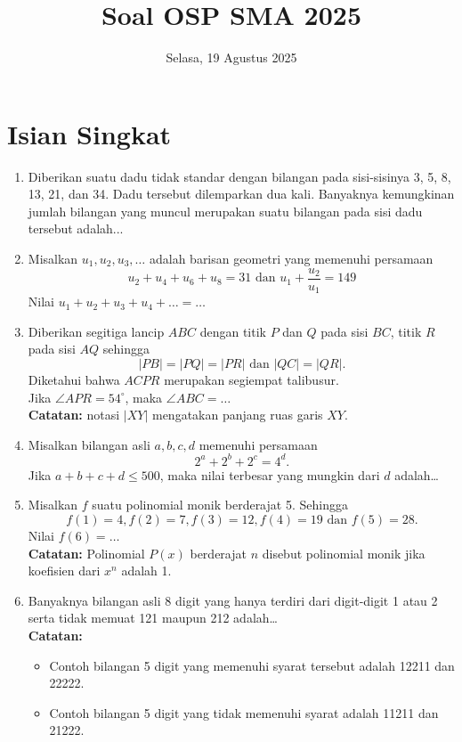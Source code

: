 \documentclass[12pt]{scrartcl}
\title{Soal OSP SMA 2025}
\date{Selasa, 19 Agustus 2025}
\begin{document}
\maketitle

\section{Isian Singkat}

\begin{enumerate}
    \item Diberikan suatu dadu tidak standar dengan bilangan pada sisi-sisinya 3, 5, 8, 13, 21, dan 34. Dadu tersebut dilemparkan dua kali. Banyaknya kemungkinan jumlah bilangan yang muncul merupakan suatu bilangan pada sisi dadu tersebut adalah...

    \item Misalkan $u_1, u_2, u_3, \dots$ adalah barisan geometri yang memenuhi persamaan 
    $$u_2 + u_4 + u_6 + u_8 = 31 \text{ dan } u_1+\dfrac{u_2}{u_1} = 149$$
    Nilai $u_1 + u_2 + u_3 + u_4 + \dots = \dots$

    \item Diberikan segitiga lancip $ABC$ dengan titik $P$ dan $Q$ pada sisi $BC$, titik $R$ pada sisi $AQ$ sehingga $$|PB|=|PQ|=|PR| \text{ dan } |QC|=|QR|.$$
    Diketahui bahwa $ACPR$ merupakan segiempat talibusur.\\
    Jika $\angle APR=54^\circ$, maka $\angle ABC = \dots$ \\
    \textbf{Catatan:} notasi $|XY|$ mengatakan panjang ruas garis $XY$.

    \item Misalkan bilangan asli $a, b, c, d$ memenuhi persamaan $$2^a+2^b+2^c=4^d.$$
    Jika $a+b+c+d \le 500$, maka nilai terbesar yang mungkin dari $d$ adalah\dots

    \newpage
    \item Misalkan $f$ suatu polinomial monik berderajat 5. Sehingga 
    $$f(1)=4, f(2)=7, f(3)=12, f(4)=19 \text{ dan }f(5)=28.$$
    Nilai $f(6)=\dots$ \\
    \textbf{Catatan:} Polinomial $P(x)$ berderajat $n$ disebut polinomial monik jika koefisien dari $x^n$ adalah 1.

    \item Banyaknya bilangan asli 8 digit yang hanya terdiri dari digit-digit 1 atau 2 serta tidak memuat 121 maupun 212 adalah\dots \\
    \textbf{Catatan:}
    \begin{itemize}
        \item Contoh bilangan 5 digit yang memenuhi syarat tersebut adalah 12211 dan 22222.
        \item Contoh bilangan 5 digit yang tidak memenuhi syarat adalah 11211 dan 21222.
    \end{itemize}


\end{enumerate}
\end{document}
